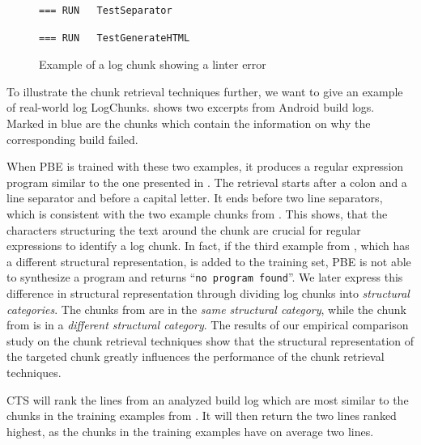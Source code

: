 \begin{figure}[tbp]
  \centering
  \begin{lstlisting}[breaklines=true,frame=tlr]
=== RUN   TestSeparator
  \end{lstlisting}
  \vspace{-\baselineskip}
  
  \vspace{-\baselineskip}
  \begin{lstlisting}[breaklines=true,frame=blr]
=== RUN   TestGenerateHTML
  \end{lstlisting}
  \caption{Example of a log chunk showing a linter error}
  \label{lst:chunk-example-3}
\end{figure}

To illustrate the chunk retrieval techniques further, we want to give
an example of real-world log LogChunks.
 shows two excerpts
from Android build logs.
Marked in blue are the chunks
which contain the information on why the
corresponding build failed.

When PBE is trained with these two examples, it produces
a regular expression program similar to the one presented in
.
The retrieval
starts after a colon and a line separator and before a capital
letter.
It ends before two line separators,
which is consistent with the two example
chunks from .
This shows, that the characters structuring the text around the chunk are
crucial for regular expressions to identify a log chunk.
In fact, if the third example from ,
which has a
different structural representation, is added to the training set,
PBE is not able to synthesize a program and returns
``\texttt{no program found}''.
We later express this difference in structural representation through
dividing log chunks into \emph{structural categories}.
The chunks from 
are in the \emph{same structural category}, while the chunk from
 is in a
\emph{different structural category}.
The results of our empirical comparison study on the chunk retrieval
techniques
show that the structural representation of the targeted chunk greatly
influences
the performance of the chunk retrieval techniques.

CTS will rank the lines from an analyzed build log which are most
similar to the chunks in the training examples
from .
It will then return the two lines ranked highest, as the chunks in
the training examples have on average two lines.

